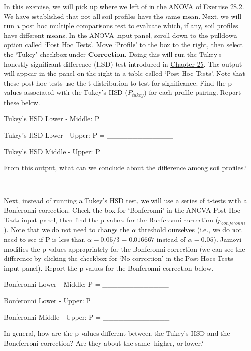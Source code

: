 \documentclass[
  openany]{scrbook}
\begin{document}
In this exercise, we will pick up where we left of in the ANOVA of Exercise 28.2.
We have established that not all soil profiles have the same mean.
Next, we will run a post hoc multiple comparisons test to evaluate which, if any, soil profiles have different means.
In the ANOVA input panel, scroll down to the pulldown option called `Post Hoc Tests'.
Move `Profile' to the box to the right, then select the `Tukey' checkbox under \textbf{Correction}.
Doing this will run the Tukey's honestly significant difference (HSD) test introduced in \protect\hyperlink{Chapter_25}{Chapter 25}.
The output will appear in the panel on the right in a table called `Post Hoc Tests'.
Note that these post-hoc tests use the t-distribution to test for significance.
Find the p-values associated with the Tukey's HSD (\(P_{tukey}\)) for each profile pairing.
Report these below.

Tukey's HSD Lower - Middle: P = \_\_\_\_\_\_\_\_\_\_\_\_\_

Tukey's HSD Lower - Upper: P = \_\_\_\_\_\_\_\_\_\_\_\_\_

Tukey's HSD Middle - Upper: P = \_\_\_\_\_\_\_\_\_\_\_\_\_

From this output, what can we conclude about the difference among soil profiles?

\begin{verbatim}


\end{verbatim}

Next, instead of running a Tukey's HSD test, we will use a series of t-tests with a Bonferonni correction.
Check the box for `Bonferonni' in the ANOVA Post Hoc Tests input panel, then find the p-values for the Bonferonni correction (\(p_{bonferonni}\)).
Note that we do not need to change the \(\alpha\) threshold ourselves (i.e., we do not need to see if P is less than \(\alpha = 0.05/3 = 0.016667\) instead of \(\alpha = 0.05\)).
Jamovi modifies the p-values appropriately for the Bonferonni correction (we can see the difference by clicking the checkbox for `No correction' in the Post Hocs Tests input panel).
Report the p-values for the Bonferonni correction below.

Bonferonni Lower - Middle: P = \_\_\_\_\_\_\_\_\_\_\_\_\_

Bonferonni Lower - Upper: P = \_\_\_\_\_\_\_\_\_\_\_\_\_

Bonferonni Middle - Upper: P = \_\_\_\_\_\_\_\_\_\_\_\_\_

In general, how are the p-values different between the Tukey's HSD and the Boneferroni correction?
Are they about the same, higher, or lower?
\end{document}
